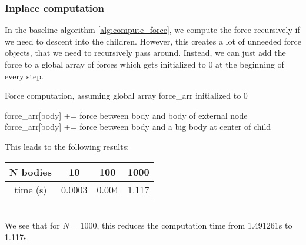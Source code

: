 \documentclass[a4paper]{scrartcl}
\begin{document}
        \subsubsection{Inplace computation}
            In the baseline algorithm \ref{alg:compute_force}, we compute the
            force recursively if we need to descent into the children. However,
            this creates a lot of unneeded force objects, that we need to
            recursively pass around. Instead, we can just add the force to a
            global array of forces which gets initialized to 0 at the beginning
            of every step.
            \begin{algorithm}[H]
                \caption{Force computation, assuming global array force\_arr initialized to 0}\label{alg:compute_force_inplace}
                \begin{algorithmic}[1]
                    \State force\_arr[body] += force between body and body of external node
                \Else      
                            \State force\_arr[body] += force between body and a big body at center of child
                            \State {}
                        \EndIf
                \EndFor
                \EndIf
                \EndProcedure
                \end{algorithmic}
            \end{algorithm}
            This leads to the following results:\\
            \noindent\begin{tabular}{c|c|c|c}
                N bodies & 10 & 100 & 1000 \\
                \hline
                time (s) & 0.0003 & 0.004 & 1.117\\
            \end{tabular}\\
            We see that for $N=1000$, this reduces the computation time from
            1.491261s to 1.117s.
\end{document}
